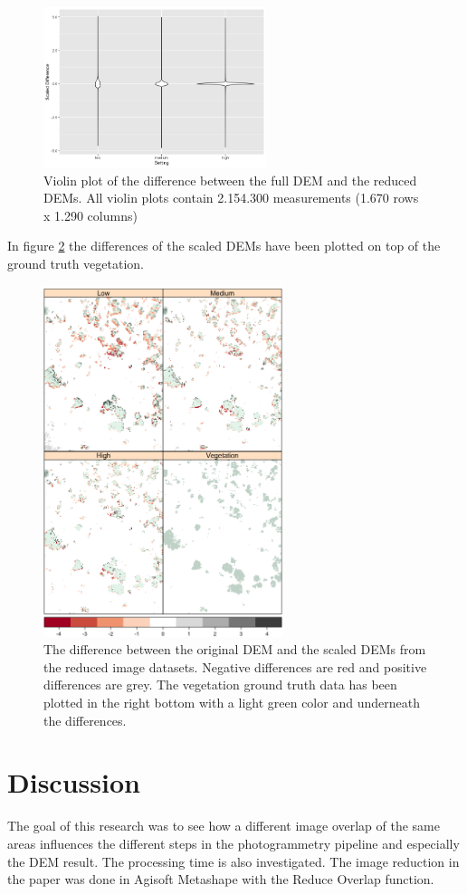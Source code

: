 \documentclass{isprs} %
\begin{document}
\begin{figure}[h]
    \centering
    \includegraphics[width=6.5cm]{ViolinPlotOrdered.png}
    \caption{Violin plot of the difference between the full DEM and the reduced DEMs. All violin plots contain 2.154.300 measurements (1.670 rows x 1.290 columns)}
    \label{fig:ViolinPlot}
\end{figure}

In figure \ref{fig:ScaledDifference} the differences of the scaled DEMs have been plotted on top of the ground truth vegetation.

\begin{figure}[h]
    \centering
    \includegraphics[width=7cm]{finalvegplot.png}
    \caption{The difference between the original DEM and the scaled DEMs from the reduced image datasets. Negative differences are red and positive differences are grey. The vegetation ground truth data has been plotted in the right bottom with a light green color and underneath the differences.}
    \label{fig:ScaledDifference}
\end{figure}

\section{Discussion}
The goal of this research was to see how a different image overlap of the same areas influences the different steps in the photogrammetry pipeline and especially the DEM result.
The processing time is also investigated.
The image reduction in the paper was done in Agisoft Metashape with the Reduce Overlap function.
\end{document}
